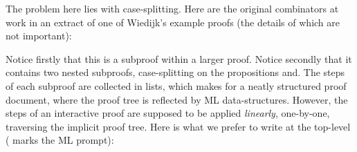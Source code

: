 The problem here lies with case-splitting. Here are the original combinators at work in an extract of one of Wiedijk's example proofs (the details of which are not important):

\vspace{0.5cm}
\begin{minipage}{\linewidth}
  \footnotesize



  \code{\enspace [fix ["p1:Point"; "p2:Point"];}


  \code{\quad\enspace[[suppose "p1 = p2";}

  \code{\qquad\enspace qed from [0] by [LEMMA1]];}

  \code{\qquad [suppose "$\neg$(p1 = p2)";}

  \code{\qquad\enspace qed from [1]]]];}

\end{minipage}
\vspace{0.5cm}

Notice firstly that this is a subproof within a larger proof. Notice secondly that it contains two nested subproofs, case-splitting on the propositions  and\linebreak {}. The steps of each subproof are collected in lists, which makes for a neatly structured proof document, where the proof tree is reflected by ML data-structures. However, the steps of an interactive proof are supposed to be applied \emph{linearly}, one-by-one, traversing the implicit proof tree. Here is what we prefer to write at the top-level (\code{>} marks the ML prompt):

\vspace{0.5cm}
\begin{minipage}{\linewidth}
  \footnotesize  







\end{minipage}
\vspace{0.5cm}

